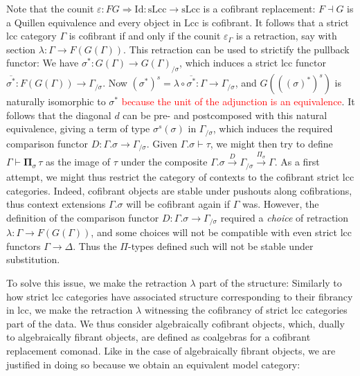 \documentclass{article}
\newcommand{\todo}[1]{\textcolor{red}{#1}}
\begin{document}
Note that the counit $\varepsilon : FG \Rightarrow \mathrm{Id} : \mathrm{sLcc} \rightarrow \mathrm{sLcc}$ is a cofibrant replacement: $F \dashv G$ is a Quillen equivalence and every object in $\mathrm{Lcc}$ is cofibrant.
It follows that a strict lcc category $\Gamma$ is cofibrant if and only if the counit $\varepsilon_\Gamma$ is a retraction, say with section $\lambda : \Gamma \rightarrow F(G(\Gamma))$.
This retraction can be used to strictify the pullback functor:
We have $\sigma^* : G(\Gamma) \rightarrow G(\Gamma)_{/ \sigma}$, which induces a strict lcc functor $\overline{\sigma^*} : F(G(\Gamma)) \rightarrow \Gamma_{/ \sigma}$.
Now $(\sigma^*)^s = \lambda \circ \overline{\sigma^*} : \Gamma \rightarrow \Gamma_{/ \sigma}$, and $G(((\sigma)^*)^s)$ is naturally isomorphic to $\sigma^*$ \todo{because the unit of the adjunction is an equivalence}.
It follows that the diagonal $d$ can be pre- and postcomposed with this natural equivalence, giving a term of type $\sigma^s(\sigma)$ in $\Gamma_{/ \sigma}$, which induces the required comparison functor $D : \Gamma.\sigma \rightarrow \Gamma_{/ \sigma}$.
Given $\Gamma.\sigma \vdash \tau$, we might then try to define $\Gamma \vdash \mathbf{\Pi}_\sigma \, \tau$ as the image of $\tau$ under the composite $\Gamma.\sigma \xrightarrow{D} \Gamma_{/ \sigma} \xrightarrow{\Pi_\sigma} \Gamma$.
As a first attempt, we might thus restrict the category of contexts to the cofibrant strict lcc categories.
Indeed, cofibrant objects are stable under pushouts along cofibrations, thus context extensions $\Gamma.\sigma$ will be cofibrant again if $\Gamma$ was.
However, the definition of the comparison functor $D : \Gamma.\sigma \rightarrow \Gamma_{/ \sigma}$ required a \emph{choice} of retraction $\lambda : \Gamma \rightarrow F(G(\Gamma))$, and some choices will not be compatible with even strict lcc functors $\Gamma \rightarrow \Delta$.
Thus the $\Pi$-types defined such will not be stable under substitution.

To solve this issue, we make the retraction $\lambda$ part of the structure:
Similarly to how strict lcc categories have associated structure corresponding to their fibrancy in lcc, we make the retraction $\lambda$ witnessing the cofibrancy of strict lcc categories part of the data.
We thus consider algebraically cofibrant objects, which, dually to algebraically fibrant objects, are defined as coalgebras for a cofibrant replacement comonad.
Like in the case of algebraically fibrant objects, we are justified in doing so because we obtain an equivalent model category:
\end{document}
